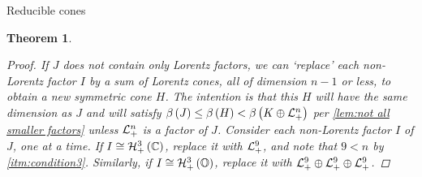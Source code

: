 \documentclass{interact}
\theoremstyle{plain}
\newtheorem{theorem}{Theorem}[section]
\theoremstyle{definition}
\theoremstyle{remark}
\begin{document}
\begin{section}{Reducible cones}
\begin{theorem}
\begin{proof}
        If $J$ \emph{does not} contain only Lorentz factors, we can
        `replace' each non-Lorentz factor $I$ by a sum of Lorentz
        cones, all of dimension $n-1$ or less, to obtain a new
        symmetric cone $H$. The intention is that this $H$ will have
        the same dimension as $J$ and will satisfy $\lyapunovrank{J}
        \le \lyapunovrank{H} < \lyapunovrank{\directsum{K}{\Lnplus}}$
        per \cref{lem:not all smaller factors} unless $\Lnplus$ is a
        factor of $J$. Consider each non-Lorentz factor $I$ of $J$,
        one at a time. If $I \cong \Hnplus[3]\of{\Cn[1]}$, replace it
        with $\Lnplus[9]$, and note that $9 < n$ by
        \cref{itm:condition3}. Similarly, if $I \cong
        \Hnplus[3]\of{\octonions}$, replace it with $\Lnplus[9] \oplus
        \Lnplus[9] \oplus \Lnplus[9]$.


\end{proof}
\end{theorem}
\end{section}
\end{document}
